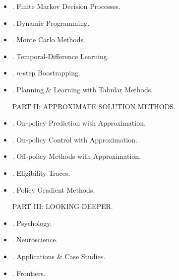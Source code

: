 \documentclass{article}
\newtheorem{example}{Example}
\begin{document}
\begin{itemize}
\begin{itemize}
        \begin{example}[Bandit Gradient Algorithm as Stochastic Gradient Ascent]
            One can gain a deeper insight into gradient bandit algorithm by understanding it as a stochastic approximation to gradient ascent. In exact {\rm gradient ascent}, each action preference $H_t(a)$ would be incremented in proportion to increment's effect on performance: (2.13)
            \begin{equation*}
                H_{t+1}(a)\coloneqq H_t(a) + \alpha\frac{\partial\mathbb{E}[R_t]}{\partial H_t(a)},
            \end{equation*}
            where measure of performance here is expected reward:
            \begin{equation*}
                \mathbb{E}[R_t] = \sum_x \pi_t(x)q_*(x),
            \end{equation*}
            \& measure of increment's effect is {\rm partial derivative} of this performance measure w.r.t. action preference.
        \end{example}
        \item {. Associative Search (Contextual Bandits).}
    \end{itemize}
    \item {. Finite Markov Decision Processes.}
    \item {. Dynamic Programming.}
    \item {. Monte Carlo Methods.}
    \item {. Temporal-Difference Learning.}
    \item {. $n$-step Boostrapping.}
    \item {. Planning \& Learning with Tabular Methods.}

    PART II: APPROXIMATE SOLUTION METHODS.
    \item {. On-policy Prediction with Approximation.}
    \item {. On-policy Control with Approximation.}
    \item {. Off-policy Methods with Approximation.}
    \item {. Eligibility Traces.}
    \item {. Policy Gradient Methods.}

    PART III: LOOKING DEEPER.
    \item {. Psychology.}
    \item {. Neuroscience.}
    \item {. Applications \& Case Studies.}
    \item {. Frontiers.}
\end{itemize}
\end{document}
